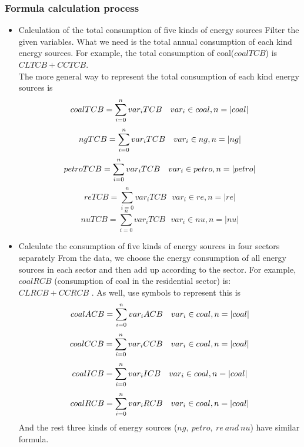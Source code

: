 \documentclass{mcmthesis}
\begin{document}
\subsubsection{Formula calculation process}
\begin{itemize}
  \item Calculation of the total consumption of five kinds of energy sources
  Filter the given variables. What we need is the total annual consumption of each kind energy sources.
  For example, the total consumption of coal($coalTCB$) is $CLTCB + CCTCB$. \\
  The more general way to represent the total consumption of each kind energy sources is\\
  $$coalTCB = \sum_{i=0}^{n} var_iTCB  \ \ \ var_i \in coal, n = |coal| \\$$
  $$ngTCB = \sum_{i=0}^{n} var_iTCB  \ \ \ var_i \in ng, n = |ng| \\$$
  $$petroTCB = \sum_{i=0}^{n} var_iTCB  \ \ \ var_i \in petro, n = |petro| \\$$
  $$reTCB = \sum_{i=0}^{n} var_iTCB  \ \ \ var_i \in re, n = |re|$$
  $$nuTCB = \sum_{i=0}^{n} var_iTCB  \ \ \ var_i \in nu, n = |nu|$$
  \item Calculate the consumption of five kinds of energy sources in four sectors separately
  From the data, we choose the energy consumption of all energy sources in each sector and then add up according to the sector.
  For example, $coalRCB$ (consumption of coal in the residential sector) is: $CLRCB + CCRCB$ .
  As well, use symbols to represent this is
  $$coalACB = \sum_{i=0}^{n} var_iACB  \ \ \ var_i \in coal, n = |coal| \\$$
  $$coalCCB = \sum_{i=0}^{n} var_iCCB  \ \ \ var_i \in coal, n = |coal| \\$$
  $$coalICB = \sum_{i=0}^{n} var_iICB  \ \ \ var_i \in coal, n = |coal| \\$$
  $$coalRCB = \sum_{i=0}^{n} var_iRCB  \ \ \ var_i \in coal, n = |coal| \\$$
  And the rest three kinds of energy sources ($ng,\ petro,\ re\ and\ nu$) have similar formula.
\end{itemize}
\end{document}
